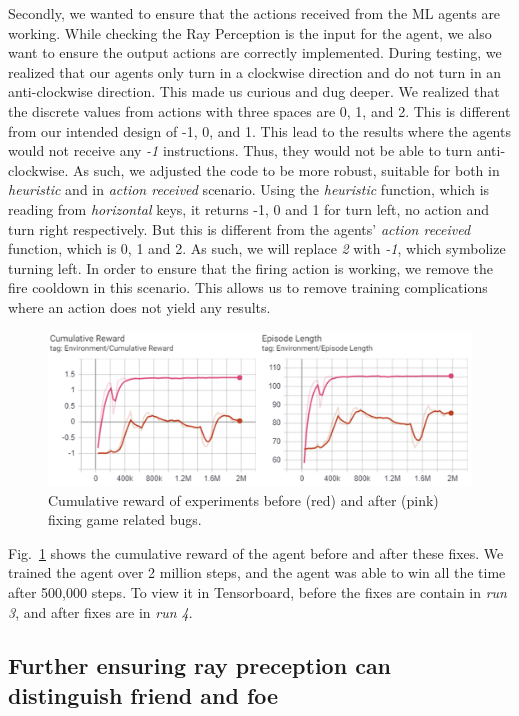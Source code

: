 \documentclass[conference]{IEEEtran}
\begin{document}
Secondly, we wanted to ensure that the actions received from the ML agents are working. While checking the Ray Perception is the input for the agent, we also want to ensure the output actions are correctly implemented. During testing, we realized that our agents only turn in a clockwise direction and do not turn in an anti-clockwise direction. This made us curious and dug deeper. We realized that the discrete values from actions with three spaces are 0, 1, and 2. This is different from our intended design of -1, 0, and 1. This lead to the results where the agents would not receive any \textit{-1} instructions. Thus, they would not be able to turn anti-clockwise. As such, we adjusted the code to be more robust, suitable for both in \textit{heuristic} and in \textit{action received} scenario. Using the \textit{heuristic} function, which is reading from \textit{horizontal} keys, it returns -1, 0 and 1 for turn left, no action and turn right respectively. But this is different from the agents' \textit{action received} function, which is 0, 1 and 2. As such, we will replace \textit{2} with \textit{-1}, which symbolize turning left. In order to ensure that the firing action is working, we remove the fire cooldown in this scenario. This allows us to remove training complications where an action does not yield any results.

\begin{figure}[ht]
\centerline{\includegraphics[width=1\textwidth]{assets/scene1_combine_1}}
\caption{Cumulative reward of experiments before (red) and after (pink) fixing game related bugs.}
\label{scene1reward}
\end{figure}

Fig.~\ref{scene1reward} shows the cumulative reward of the agent before and after these fixes. We trained the agent over 2 million steps, and the agent was able to win all the time after 500,000 steps. To view it in Tensorboard, before the fixes are contain in \textit{run 3}, and after fixes are in \textit{run 4}.

\subsection{Further ensuring ray preception can distinguish friend and foe}
\end{document}
